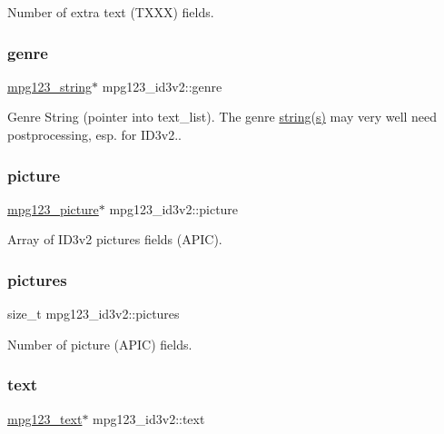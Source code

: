 Number of extra text (T\+X\+XX) fields. \mbox{\label{structmpg123__id3v2_a1655bf8bfc836ab94660bf981373f3cb}} 
\subsubsection{\texorpdfstring{genre}{genre}}
{\footnotesize\ttfamily \hyperlink{structmpg123__string}{mpg123\+\_\+string}$\ast$ mpg123\+\_\+id3v2\+::genre}

Genre String (pointer into text\+\_\+list). The genre \hyperlink{structstring}{string(s)} may very well need postprocessing, esp. for I\+D3v2.. \mbox{\label{structmpg123__id3v2_ad2539ee2a294163a20ef2f67bc241d76}} 
\subsubsection{\texorpdfstring{picture}{picture}}
{\footnotesize\ttfamily \hyperlink{structmpg123__picture}{mpg123\+\_\+picture}$\ast$ mpg123\+\_\+id3v2\+::picture}

Array of I\+D3v2 pictures fields (A\+P\+IC). \mbox{\label{structmpg123__id3v2_ac13f50ac1a8d70b8be6580a71efc89b5}} 
\subsubsection{\texorpdfstring{pictures}{pictures}}
{\footnotesize\ttfamily size\+\_\+t mpg123\+\_\+id3v2\+::pictures}

Number of picture (A\+P\+IC) fields. \mbox{\label{structmpg123__id3v2_a2974751dc4b5bc34819d0acb1b90e944}} 
\subsubsection{\texorpdfstring{text}{text}}
{\footnotesize\ttfamily \hyperlink{structmpg123__text}{mpg123\+\_\+text}$\ast$ mpg123\+\_\+id3v2\+::text}

